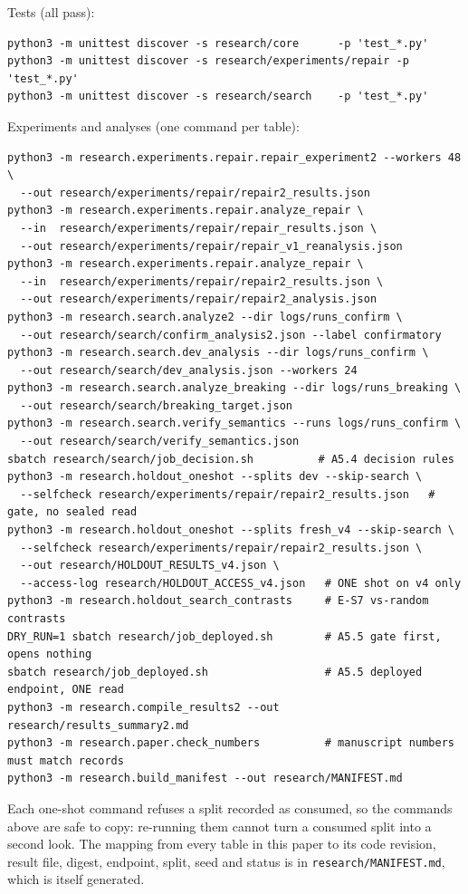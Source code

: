 \documentclass[11pt]{article}
\begin{document}
\noindent
Tests (all pass):
\begin{verbatim}
python3 -m unittest discover -s research/core      -p 'test_*.py'
python3 -m unittest discover -s research/experiments/repair -p 'test_*.py'
python3 -m unittest discover -s research/search    -p 'test_*.py'
\end{verbatim}
Experiments and analyses (one command per table):
\begin{verbatim}
python3 -m research.experiments.repair.repair_experiment2 --workers 48 \
  --out research/experiments/repair/repair2_results.json
python3 -m research.experiments.repair.analyze_repair \
  --in  research/experiments/repair/repair_results.json \
  --out research/experiments/repair/repair_v1_reanalysis.json
python3 -m research.experiments.repair.analyze_repair \
  --in  research/experiments/repair/repair2_results.json \
  --out research/experiments/repair/repair2_analysis.json
python3 -m research.search.analyze2 --dir logs/runs_confirm \
  --out research/search/confirm_analysis2.json --label confirmatory
python3 -m research.search.dev_analysis --dir logs/runs_confirm \
  --out research/search/dev_analysis.json --workers 24
python3 -m research.search.analyze_breaking --dir logs/runs_breaking \
  --out research/search/breaking_target.json
python3 -m research.search.verify_semantics --runs logs/runs_confirm \
  --out research/search/verify_semantics.json
sbatch research/search/job_decision.sh          # A5.4 decision rules
python3 -m research.holdout_oneshot --splits dev --skip-search \
  --selfcheck research/experiments/repair/repair2_results.json   # gate, no sealed read
python3 -m research.holdout_oneshot --splits fresh_v4 --skip-search \
  --selfcheck research/experiments/repair/repair2_results.json \
  --out research/HOLDOUT_RESULTS_v4.json \
  --access-log research/HOLDOUT_ACCESS_v4.json   # ONE shot on v4 only
python3 -m research.holdout_search_contrasts     # E-S7 vs-random contrasts
DRY_RUN=1 sbatch research/job_deployed.sh        # A5.5 gate first, opens nothing
sbatch research/job_deployed.sh                  # A5.5 deployed endpoint, ONE read
python3 -m research.compile_results2 --out research/results_summary2.md
python3 -m research.paper.check_numbers          # manuscript numbers must match records
python3 -m research.build_manifest --out research/MANIFEST.md
\end{verbatim}
Each one-shot command refuses a split recorded as consumed, so the commands above are safe
to copy: re-running them cannot turn a consumed split into a second look. The mapping from
every table in this paper to its code revision, result file, digest, endpoint, split, seed
and status is in \texttt{research/MANIFEST.md}, which is itself generated.
\end{document}
